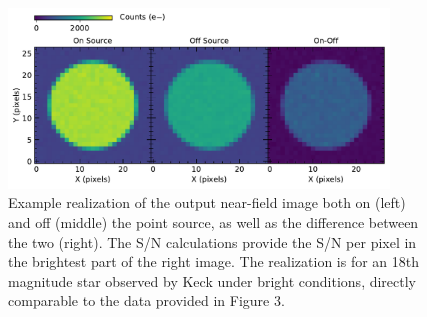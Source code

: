 \documentclass[onecolumn,floatfix,tighten]{aastex62}
\begin{document}
\begin{figure}
\begin{center}
\includegraphics[width=0.9\textwidth]{fiddles_etc_realization.pdf}
\end{center}
\caption{Example realization of the output near-field image both on
(left) and off (middle) the point source, as well as the difference
between the two (right). The S/N calculations provide the S/N per
pixel in the brightest part of the right image. The realization is
for an 18th magnitude star observed by Keck under bright conditions,
directly comparable to the data provided in Figure 3.}
\label{fig:images}
\end{figure}
\end{document}
